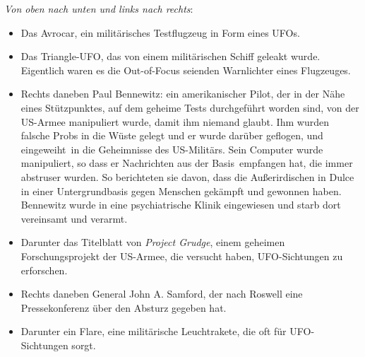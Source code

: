 \documentclass{scrartcl}
\begin{document}
\textit{Von oben nach unten und links nach rechts}:

\begin{itemize}
	\item Das Avrocar, ein militärisches Testflugzeug in Form eines UFOs. 
	\item Das Triangle-UFO, das von einem militärischen Schiff geleakt wurde. Eigentlich waren es die Out-of-Focus seienden Warnlichter eines Flugzeuges.
	\item Rechts daneben Paul Bennewitz: ein amerikanischer Pilot, der in der Nähe eines Stützpunktes, auf dem geheime Tests durchgeführt worden sind, von der US-Armee manipuliert wurde, damit ihm niemand glaubt. Ihm wurden falsche Probs in die Wüste gelegt und er wurde darüber geflogen, und \frq eingeweiht\flq\ in die Geheimnisse des US-Militärs. Sein Computer wurde manipuliert, so dass er Nachrichten \frq aus der Basis\flq\ empfangen hat, die immer abstruser wurden. So berichteten sie davon, dass die Außerirdischen in Dulce in einer Untergrundbasis gegen Menschen gekämpft und gewonnen haben. Bennewitz wurde in eine psychiatrische Klinik eingewiesen und starb dort vereinsamt und verarmt.

	\item Darunter das Titelblatt von \textit{Project Grudge}, einem geheimen Forschungsprojekt der US-Armee, die versucht haben, UFO-Sichtungen zu erforschen. 
	\item Rechts daneben General John A. Samford, der nach Roswell eine Pressekonferenz über den Absturz gegeben hat.
	\item Darunter ein Flare, eine militärische Leuchtrakete, die oft für UFO-Sichtungen sorgt.
\end{itemize}
\end{document}
